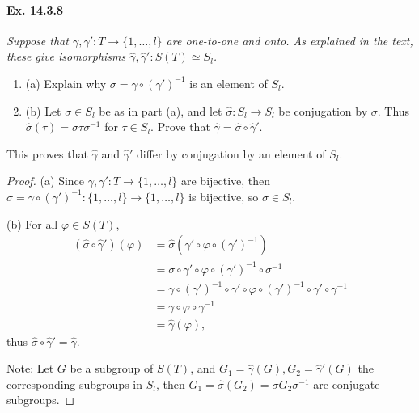 \documentclass[11pt,a4paper]{article}
\newcommand{\be} {\begin{enumerate}}
\newcommand{\ee} {\end{enumerate}}
\begin{document}
 \paragraph{Ex. 14.3.8}{\it Suppose that $\gamma, \gamma' : T \to \{1,\ldots,l\}$ are one-to-one and onto. As explained in the text, these give isomorphisms $\hat{\gamma},\hat{\gamma}' : S(T)\simeq S_l$.
 \be
 \item[(a)] Explain why $\sigma = \gamma \circ (\gamma')^{-1}$ is an element of $S_l$.
 \item[(b)] Let $\sigma \in S_l$ be as in part (a), and let $\hat{\sigma} : S_l \to S_l$ be conjugation by $\sigma$. Thus $\hat{\sigma}(\tau) = \sigma\tau\sigma^{-1}$ for $\tau \in S_l$. Prove that $\hat{\gamma} = \hat{\sigma} \circ \hat{\gamma}'$.
 \ee
 This proves that $\hat{\gamma}$ and $\hat{\gamma}' $ differ by conjugation by an element of $S_l$.
 }
 \begin{proof}
 \item[(a)] Since $\gamma, \gamma' : T \to \{1,\ldots,l\}$ are bijective, then $\sigma =  \gamma \circ (\gamma')^{-1} : \{1,\ldots,l\} \to \{1,\ldots,l\}$ is bijective, so 
 $\sigma \in S_l$.
 
 \item[(b)] For all $\varphi \in S(T)$,
 \begin{align*}
 (\hat \sigma \circ \hat \gamma')(\varphi)&= \hat \sigma(\gamma' \circ \varphi \circ (\gamma')^{-1})\\
 &= \sigma \circ \gamma' \circ \varphi \circ (\gamma')^{-1} \circ \sigma^{-1}\\
 &= \gamma \circ (\gamma')^{-1} \circ \gamma' \circ \varphi \circ (\gamma')^{-1} \circ \gamma' \circ \gamma^{-1}\\
 &=\gamma \circ \varphi \circ \gamma^{-1}\\
 &= \hat \gamma(\varphi),
 \end{align*}
 thus $\hat \sigma \circ \hat \gamma' = \hat \gamma$.
 
 Note: Let $G$ be a subgroup of $S(T)$, and $G_1 = \hat \gamma(G), G_2 = \hat\gamma'(G)$ the corresponding subgroups in $S_l$, then $G_1 = \hat \sigma(G_2) = \sigma G_2 \sigma^{-1}$ are conjugate subgroups.
 \end{proof}       
 
\end{document}
